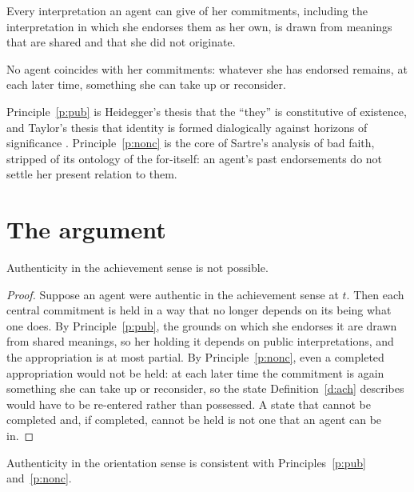 \documentclass{situationist-preprint}
\begin{document}
\begin{principle}\label{p:pub}
Every interpretation an agent can give of her commitments, including the interpretation in which she endorses them as her own, is drawn from meanings that are shared and that she did not originate.
\end{principle}

\begin{principle}\label{p:nonc}
No agent coincides with her commitments: whatever she has endorsed remains, at each later time, something she can take up or reconsider.
\end{principle}

Principle~\ref{p:pub} is Heidegger's thesis that the \enquote{they} is constitutive of existence, and Taylor's thesis that identity is formed dialogically against horizons of significance \citep[ch.~4]{Taylor1991}. Principle~\ref{p:nonc} is the core of Sartre's analysis of bad faith, stripped of its ontology of the for-itself: an agent's past endorsements do not settle her present relation to them.

\section{The argument}

\begin{lemma}\label{l:noach}
Authenticity in the achievement sense is not possible.
\end{lemma}

\begin{proof}
Suppose an agent were authentic in the achievement sense at $t$. Then each central commitment is held in a way that no longer depends on its being what one does. By Principle~\ref{p:pub}, the grounds on which she endorses it are drawn from shared meanings, so her holding it depends on public interpretations, and the appropriation is at most partial. By Principle~\ref{p:nonc}, even a completed appropriation would not be held: at each later time the commitment is again something she can take up or reconsider, so the state Definition~\ref{d:ach} describes would have to be re-entered rather than possessed. A state that cannot be completed and, if completed, cannot be held is not one that an agent can be in.
\end{proof}

\begin{lemma}\label{l:or}
Authenticity in the orientation sense is consistent with Principles~\ref{p:pub} and~\ref{p:nonc}.
\end{lemma}
\end{document}
